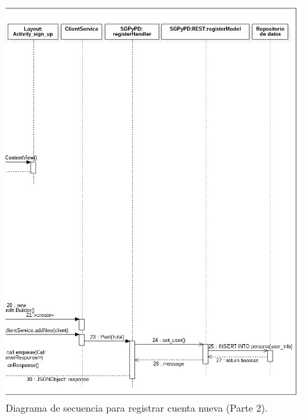 \FloatBarrier
\begin{figure}[htbp!]
		\centering
			\includegraphics[width=0.9 \textwidth]{imagenes/Diagramas_UserApp/Nuevos_diagramas/CuentaNueva_2}
		\caption{Diagrama de secuencia para registrar cuenta nueva (Parte 2).}
		\label{image:RegistrarCuenta2}
\end{figure}
\FloatBarrier

